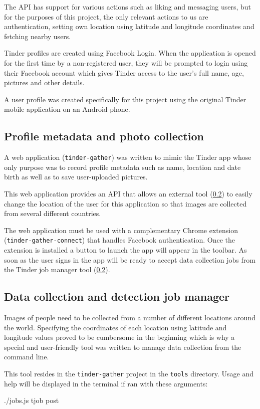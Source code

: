 The API has support for various actions such as liking and messaging users, 
but for the purposes of this project, the only relevant actions to us are 
authentication, setting own location using latitude and longitude coordinates 
and fetching nearby users.

Tinder profiles are created using Facebook Login. When the application is 
opened for the first time by a non-registered user, they will be prompted to 
login using their Facebook account which gives Tinder access to the user's full name, 
age, pictures and other details.

A user profile was created specifically for this project using the original 
Tinder mobile application on an Android phone. 

\subsection{Profile metadata and photo collection}
A web application (\texttt{tinder-gather}) was written to mimic the Tinder app
whose only purpose was to record profile metadata such as name, location and
date birth as well as to save user-uploaded pictures. 

This web application provides an API that allows an external tool 
(\ref{spec:data:jobs}) to easily change the location of the user for this 
application so that images are collected from several different 
countries.

The web application must be used with a complementary Chrome extension 
(\texttt{tinder-gather-connect}) that handles Facebook authentication.
Once the extension is installed a button to launch the app will appear in the 
toolbar. As soon as the user signs in the app will be ready to accept data 
collection jobs from the Tinder job manager tool (\ref{spec:data:jobs}).

\subsection{Data collection and detection job manager}
\label{spec:data:jobs}
Images of people need to be collected from a number of different locations 
around the world. Specifying the coordinates of each location using latitude 
and longitude values proved to be cumbersome in the beginning which is why a 
special and user-friendly tool was written to manage data collection from the 
command line.

This tool resides in the \texttt{tinder-gather} project in the \texttt{tools} 
directory. Usage and help will be displayed in the terminal if ran with these 
arguments:
\begin{logs}
./jobs.js tjob post
\end{logs}


